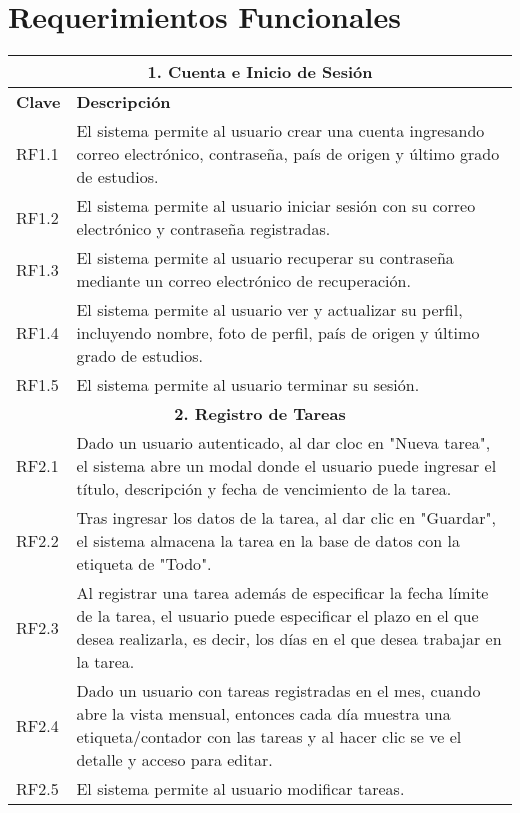 \documentclass[11pt]{article}
\begin{document}
\section{Requerimientos Funcionales}
\begin{table}[H]
    \centering
    \begin{tabular}{|p{2cm}|p{13cm}|}
    \hline
    \multicolumn{2}{|c|}{\textbf{1. Cuenta e Inicio de Sesión}} \\
    \hline
    \textbf{Clave} & \textbf{Descripción } \\
    \hline
    RF1.1 & El sistema permite al usuario crear una cuenta ingresando correo electrónico, contraseña,
     país de origen y último grado de estudios. \\
     \hline
    RF1.2 & El sistema permite al usuario iniciar sesión con su correo electrónico y contraseña registradas. \\
    \hline
    RF1.3 & El sistema permite al usuario recuperar su contraseña mediante un correo electrónico de recuperación.\\
    \hline
    RF1.4 & El sistema permite al usuario ver y actualizar su perfil, incluyendo nombre, foto de perfil, país de origen y último grado de estudios. \\
    \hline
    RF1.5 & El sistema permite al usuario terminar su sesión.\\
    \hline
    \multicolumn{2}{|c|}{\textbf{2. Registro de Tareas}} \\
    \hline
    RF2.1 & Dado un usuario autenticado, al dar cloc en "Nueva tarea", el sistema abre un modal donde el usuario puede ingresar el título, descripción
     y fecha de vencimiento de la tarea. \\
    \hline
    RF2.2 & Tras ingresar los datos de la tarea, al dar clic en "Guardar", el sistema almacena la tarea en la base de datos con la etiqueta de "Todo".\\
    \hline
    RF2.3 & Al registrar una tarea además de especificar la fecha límite de la tarea, el usuario puede especificar el plazo en el que desea realizarla, es decir,
     los días en el que desea trabajar en la tarea. \\
    \hline
    RF2.4 & Dado un usuario con tareas registradas en el mes, cuando abre la vista mensual, entonces cada día muestra una etiqueta/contador con las tareas 
    y al hacer clic se ve el detalle y acceso para editar. \\
    \hline
    RF2.5 & El sistema permite al usuario modificar tareas. \\

\end{tabular}
\end{table}
\end{document}
